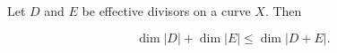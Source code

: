 Let $D$ and $E$ be effective divisors on a curve $X$. Then

$$\dim|D| + \dim|E| \leqslant \dim|D + E|.$$
